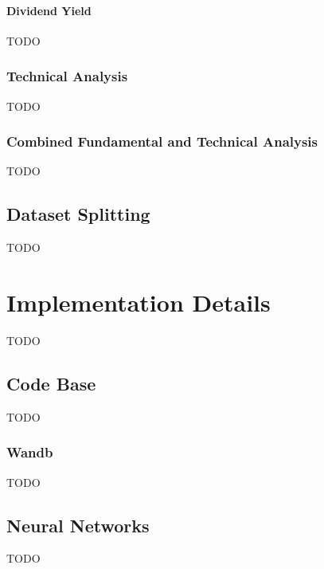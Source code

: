 \documentclass[../xlapes02]{subfiles}
\begin{document}
    \paragraph{Dividend Yield}\label{par:dividend-yield}
    TODO

    \subsubsection{Technical Analysis}\label{subsubsec:technical-analysis}
    TODO

    \subsubsection{Combined Fundamental and Technical Analysis}\label{subsubsec:combined-fundamental-and-technical-analysis}
    TODO

    \subsection{Dataset Splitting}\label{subsec:dataset-splitting}
    TODO


    \section{Implementation Details}\label{sec:implementation-details}
    TODO

    \subsection{Code Base}\label{subsec:code-base}
    TODO

    \subsubsection{Wandb}\label{subsubsec:wandb}
    TODO

    \subsection{Neural Networks}\label{subsec:neural-network}
    TODO

\end{document}

